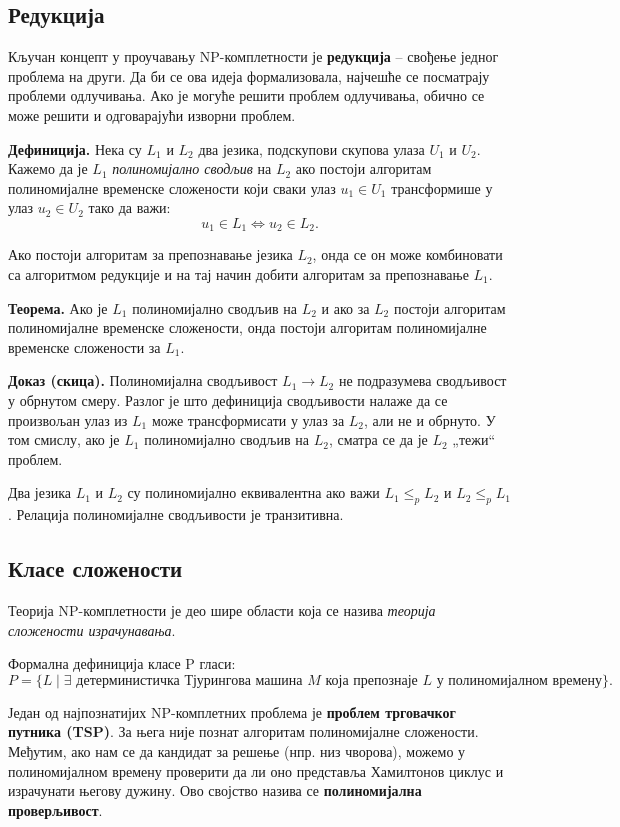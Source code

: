 \documentclass[12pt,oneside]{memoir}
\begin{document}
\subsection{Редукција}
Кључан концепт у проучавању NP-комплетности је \textbf{редукција} – свођење једног проблема на други. Да би се ова идеја формализовала, најчешће се посматрају проблеми одлучивања. Ако је могуће решити проблем одлучивања, обично се може решити и одговарајући изворни проблем.  

\textbf{Дефиниција.} Нека су $L_1$ и $L_2$ два језика, подскупови скупова улаза $U_1$ и $U_2$. Кажемо да је $L_1$ \textit{полиномијално сводљив} на $L_2$ ако постоји алгоритам полиномијалне временске сложености који сваки улаз $u_1 \in U_1$ трансформише у улаз $u_2 \in U_2$ тако да важи:
\[
u_1 \in L_1 \iff u_2 \in L_2.
\]

Ако постоји алгоритам за препознавање језика $L_2$, онда се он може комбиновати са алгоритмом редукције и на тај начин добити алгоритам за препознавање $L_1$.  

\textbf{Теорема.} Ако је $L_1$ полиномијално сводљив на $L_2$ и ако за $L_2$ постоји алгоритам полиномијалне временске сложености, онда постоји алгоритам полиномијалне временске сложености за $L_1$.  

\textbf{Доказ (скица).} Полиномијална сводљивост $L_1 \to L_2$ не подразумева сводљивост у обрнутом смеру. Разлог је што дефиниција сводљивости налаже да се произвољан улаз из $L_1$ може трансформисати у улаз за $L_2$, али не и обрнуто. У том смислу, ако је $L_1$ полиномијално сводљив на $L_2$, сматра се да је $L_2$ „тежи“ проблем.  

Два језика $L_1$ и $L_2$ су полиномијално еквивалентна ако важи $L_1 \leq_p L_2$ и $L_2 \leq_p L_1$. Релација полиномијалне сводљивости је транзитивна.  

\subsection{Класе сложености}
Теорија NP-комплетности је део шире области која се назива \textit{теорија сложености израчунавања}.  

Формална дефиниција класе P гласи:
\[
P = \{ L \mid \exists \text{ детерминистичка Тјурингова машина } M \text{ која препознаје } L \text{ у полиномијалном времену} \}.
\]

Један од најпознатијих NP-комплетних проблема је \textbf{проблем трговачког путника (TSP)}. За њега није познат алгоритам полиномијалне сложености. Међутим, ако нам се да кандидат за решење (нпр. низ чворова), можемо у полиномијалном времену проверити да ли оно представља Хамилтонов циклус и израчунати његову дужину. Ово својство назива се \textbf{полиномијална проверљивост}.  
\end{document}
